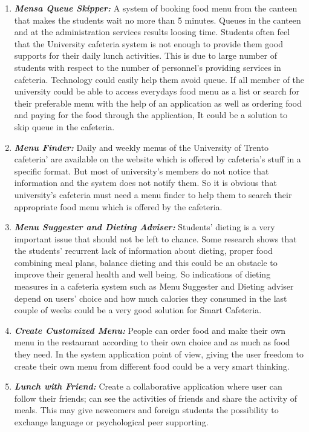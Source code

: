 \begin{enumerate}
\item  \textit{\textbf{Mensa Queue Skipper:}} A system of booking food menu from
the canteen that makes the students wait no more than 5 minutes.
Queues in the canteen and at the administration services results loosing time.
Students often feel that the University cafeteria system is not enough to
provide them good supports for their daily lunch activities. This is due to
large number of students with respect to the number of personnel's providing
services in cafeteria. Technology could easily help them avoid queue. If all
member of the university could be able to access everydays food menu as a list
or search for their preferable menu with the help of an application as well as
ordering food and paying for the food through the application, It could be a
solution to skip queue in the cafeteria.

\item \textit{\textbf{Menu Finder:}} Daily and weekly menus of the University of
Trento cafeteria' are available on the website which is offered by cafeteria's
stuff in a specific format. But most of university's members do not notice that
information and the system does not notify them. So it is obvious that
university's cafeteria must need a menu finder to help them to search their
appropriate food menu which is offered by the cafeteria.

\item \textit{\textbf{Menu Suggester and Dieting Adviser:}} Students' dieting is
a very important issue that should not be left to chance. Some research
\cite{HealthyDiet} shows that the students' recurrent lack of information about
dieting, proper food combining meal plans, balance dieting and this could be an
obstacle to improve their general health and well being. So indications of
dieting measures in a cafeteria system such as Menu Suggester and Dieting
adviser depend on users' choice and how much calories they consumed in the last
couple of weeks could be a very good solution for Smart Cafeteria.

\item \textit{\textbf{Create Customized Menu:}} People can order food and make their
own menu in the restaurant according to their own choice and as much as food
they need. In the system application point of view, giving the user freedom to
create their own menu from different food could be a very smart thinking.

\item \textit{\textbf{Lunch with Friend:}} Create a collaborative application
where user can follow their friends; can see the activities of friends and share
the activity of meals. This may give newcomers and foreign students the
possibility to exchange language or psychological peer supporting.

\end{enumerate}

